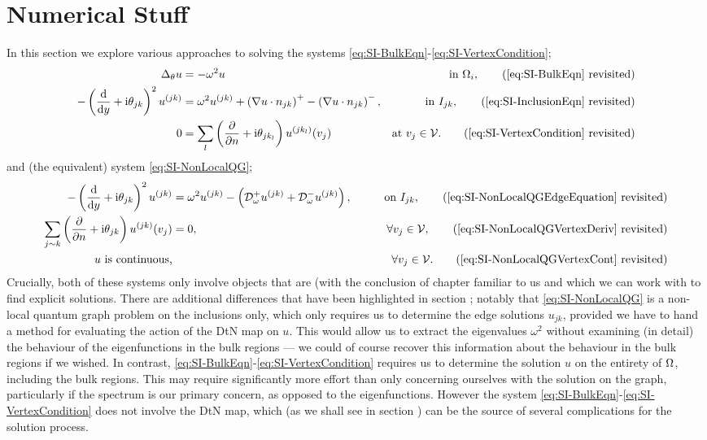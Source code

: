 \section{Numerical Stuff} \label{sec:SingIncNumerics}


In this section we explore various approaches to solving the systems \eqref{eq:SI-BulkEqn}-\eqref{eq:SI-VertexCondition};
\begin{align*}
	\laplacian_\qm u 
	&= -\omega^2 u 
	&\text{in } \ddom_i, 
	\tag{\ref{eq:SI-BulkEqn} revisited} \\
	- \bracs{\diff{}{y} + \rmi\qm_{jk}}^2u^{(jk)} 
	&= \omega^2 u^{(jk)} + \bracs{\grad u\cdot n_{jk}}^+ - \bracs{\grad u\cdot n_{jk}}^-,
	&\text{in } I_{jk}, 
	\tag{\ref{eq:SI-InclusionEqn} revisited} \\
	0 
	&= \sum_l \bracs{\pdiff{}{n}+\rmi\qm_{jk_l}} u^{(jk_l)}(v_j) 
	&\text{at } v_j\in\vertSet. 
	\tag{\ref{eq:SI-VertexCondition} revisited}
\end{align*}
and (the equivalent) system \eqref{eq:SI-NonLocalQG};
\begin{align*}
	- \bracs{\diff{}{y} + \rmi\qm_{jk}}^2u^{(jk)} 
	&= \omega^2 u^{(jk)} - \bracs{ \dtn^+_\omega u^{(jk)} + \dtn^-_\omega u^{(jk)}},
	&\qquad\text{on } I_{jk}, 
	\tag{\ref{eq:SI-NonLocalQGEdgeEquation} revisited}  \\
	\sum_{j\con k} \bracs{\pdiff{}{n}+\rmi\qm_{jk}} u^{(jk)}(v_j) 
	&= 0,
	&\qquad\forall v_j\in\vertSet, \tag{\ref{eq:SI-NonLocalQGVertexDeriv} revisited} \\
	u \text{ is continuous,} 
	& 
	&\qquad\forall v_j\in\vertSet. \tag{\ref{eq:SI-NonLocalQGVertexCont} revisited}
\end{align*}
Crucially, both of these systems only involve objects that are (with the conclusion of chapter  familiar to us and which we can work with to find explicit solutions.
There are additional differences that have been highlighted in section ; notably that \eqref{eq:SI-NonLocalQG} is a non-local quantum graph problem on the inclusions only, which only requires us to determine the edge solutions $u_{jk}$, provided we have to hand a method for evaluating the action of the DtN map on $u$.
This would allow us to extract the eigenvalues $\omega^2$ without examining (in detail) the behaviour of the eigenfunctions in the bulk regions --- we could of course recover this information about the behaviour in the bulk regions if we wished.
In contrast, \eqref{eq:SI-BulkEqn}-\eqref{eq:SI-VertexCondition} requires us to determine the solution $u$ on the entirety of $\Omega$, including the bulk regions.
This may require significantly more effort than only concerning ourselves with the solution on the graph, particularly if the spectrum is our primary concern, as opposed to the eigenfunctions.
However the system \eqref{eq:SI-BulkEqn}-\eqref{eq:SI-VertexCondition} does not involve the DtN map, which (as we shall see in section ) can be the source of several complications for the solution process.

